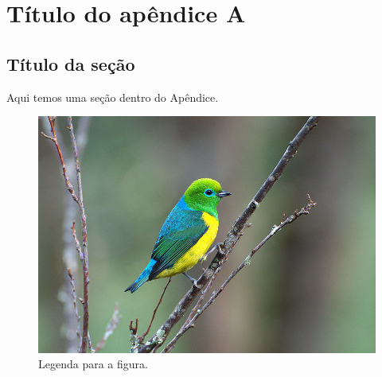 \chapter[apendiceA]{Título do apêndice A}\label{apendiceA}

\lipsum[50]

\section{Título da seção}

Aqui temos uma seção dentro do Apêndice.

\begin{figure}
    \begin{center}
        \includegraphics[width=12cm]{img/abntex2-modelo-livro-bandeirinha}
        \caption{Legenda para a figura.}
        \label{rotulo1}
    \end{center}
\end{figure}
